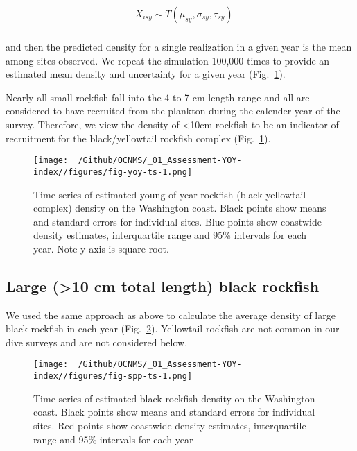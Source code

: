 \documentclass[
  letterpaper,
  DIV=11,
  numbers=noendperiod]{scrartcl}
\begin{document}
\begin{align}  & X_{isy} \sim T(\mu_{sy},\sigma_{sy},\tau_{sy}) \\ \end{align}

and then the predicted density for a single realization in a given year
is the mean among sites observed. We repeat the simulation 100,000 times
to provide an estimated mean density and uncertainty for a given year
(Fig.~\ref{fig-yoy-ts}).

Nearly all small rockfish fall into the 4 to 7 cm length range and all
are considered to have recruited from the plankton during the calender
year of the survey. Therefore, we view the density of \textless10cm
rockfish to be an indicator of recruitment for the black/yellowtail
rockfish complex (Fig.~\ref{fig-yoy-ts}).

\begin{figure}[H]

{\centering \texttt{[image: ~/Github/OCNMS/\_01\_Assessment-YOY-index//figures/fig-yoy-ts-1.png]}

}

\caption{\label{fig-yoy-ts}Time-series of estimated young-of-year
rockfish (black-yellowtail complex) density on the Washington coast.
Black points show means and standard errors for individual sites. Blue
points show coastwide density estimates, interquartile range and 95\%
intervals for each year. Note y-axis is square root.}

\end{figure}

\newpage

\hypertarget{large-10-cm-total-length-black-rockfish}{%
\subsection{Large (\textgreater10 cm total length) black
rockfish}\label{large-10-cm-total-length-black-rockfish}}

We used the same approach as above to calculate the average density of
large black rockfish in each year (Fig.~\ref{fig-spp-ts}). Yellowtail
rockfish are not common in our dive surveys and are not considered
below.

\begin{figure}[H]

{\centering \texttt{[image: ~/Github/OCNMS/\_01\_Assessment-YOY-index//figures/fig-spp-ts-1.png]}

}

\caption{\label{fig-spp-ts}Time-series of estimated black rockfish
density on the Washington coast. Black points show means and standard
errors for individual sites. Red points show coastwide density
estimates, interquartile range and 95\% intervals for each year}

\end{figure}
\end{document}
